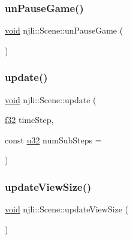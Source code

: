 \subsubsection{\texorpdfstring{un\+Pause\+Game()}{unPauseGame()}}
{\footnotesize\ttfamily \mbox{\hyperlink{_thread_8h_af1e856da2e658414cb2456cb6f7ebc66}{void}} njli\+::\+Scene\+::un\+Pause\+Game (\begin{DoxyParamCaption}{ }\end{DoxyParamCaption})}

\mbox{\label{classnjli_1_1_scene_aad491cfead02896db73ba6271d58a298}} 
\subsubsection{\texorpdfstring{update()}{update()}}
{\footnotesize\ttfamily \mbox{\hyperlink{_thread_8h_af1e856da2e658414cb2456cb6f7ebc66}{void}} njli\+::\+Scene\+::update (\begin{DoxyParamCaption}\item[{\mbox{\hyperlink{_util_8h_a5f6906312a689f27d70e9d086649d3fd}{f32}}}]{time\+Step,  }\item[{const \mbox{\hyperlink{_util_8h_a10e94b422ef0c20dcdec20d31a1f5049}{u32}}}]{num\+Sub\+Steps = {} }\end{DoxyParamCaption})\hspace{0.3cm}{\ttfamily [protected]}}

\mbox{\label{classnjli_1_1_scene_a5fbe046c6f2d690408381f2ef4c4f3ae}} 
\subsubsection{\texorpdfstring{update\+View\+Size()}{updateViewSize()}}
{\footnotesize\ttfamily \mbox{\hyperlink{_thread_8h_af1e856da2e658414cb2456cb6f7ebc66}{void}} njli\+::\+Scene\+::update\+View\+Size (\begin{DoxyParamCaption}{ }\end{DoxyParamCaption})}

\mbox{\label{classnjli_1_1_scene_a86245ab3697f318800abeee65135895e}} 
